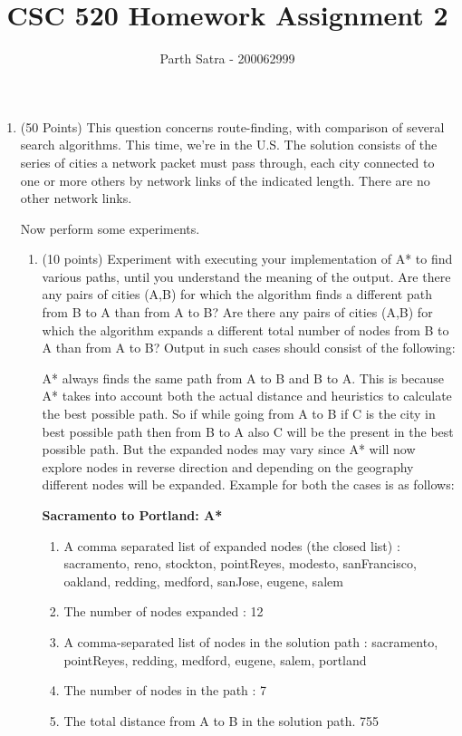 \documentclass[letterpaper]{article}
\title{CSC 520 Homework Assignment 2}
\author{Parth Satra - 200062999}
\begin{document}
\maketitle

\begin{enumerate}
  \item (50 Points) This question concerns route-finding, with comparison
  of several search algorithms. This time, we're in the U.S. The solution consists
  of the series of cities a network packet must pass through, 
  each city connected to one or more others by network links of the indicated length. 
  There are no other network links.
  
  Now perform some experiments.
  	\begin{enumerate}
  	  \item (10 points) Experiment with executing your implementation of
  	  A* to find various paths, until you understand the meaning of the output. 
  	  Are there any pairs of cities (A,B) for which the algorithm finds a different path from B to A than from A to B? 
  	  Are there any pairs of cities (A,B) for which the algorithm expands a different total number of nodes from B to A 
  	  than from A to B?
  	  Output in such cases should consist of the following:
  	  \begin{answer}
  	  	A* always finds the same path from A to B and B to A. This is because A*
  	  	takes into account both the actual distance and heuristics to calculate
  	  	the best possible path. So if while going from A to B if C is the city in
  	  	best possible path then from B to A also C will be the present in the best
  	  	possible path. But the expanded nodes may vary since A* will now explore
  	  	nodes in reverse direction and depending on the geography different nodes
  	  	will be expanded. Example for both the cases is as follows:
		\bigskip
		
  	  	\textbf{Sacramento to Portland: A*}
		\begin{enumerate}
			\item A comma separated list of expanded nodes (the closed list) :
			sacramento, reno, stockton, pointReyes, modesto, sanFrancisco, oakland,
			redding, medford, sanJose, eugene, salem
			\item The number of nodes expanded : 
			12
			\item A comma-separated list of nodes in the solution path :
			sacramento, pointReyes, redding, medford, eugene, salem, portland
			\item The number of nodes in the path : 
			7
			\item The total distance from A to B in the solution path.
			755
		\end{enumerate}
		\bigskip
		

\end{answer}
\end{enumerate}
\end{enumerate}
\end{document}
